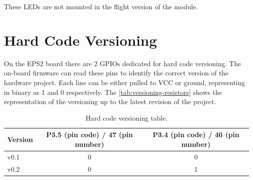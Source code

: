 These LEDs are not mounted in the flight version of the module.

\section{Hard Code Versioning}

On the EPS2 board there are 2 GPIOs dedicated for hard code versioning.
The on-board firmware can read these pins to identify the correct version of the hardware project.
Each line can be either pulled to VCC or ground, representing in binary as 1 and 0 respectively.
The \autoref{tab:versioning-resistors} shows the representation of the versioning up to the latest revision of the project.

\begin{table}[!h]
    \centering
    \begin{tabular}{lcc}
        \toprule[1.5pt]
        \textbf{Version}    &   \textbf{P3.5 (pin code) / 47 (pin number)}    &    \textbf{P3.4 (pin code) / 46 (pin number)}\\
        \midrule
        v0.1                & 0                 & 0              \\
        v0.2                & 0                 & 1              \\
        \bottomrule[1.5pt]
    \end{tabular}
    \caption{Hard code versioning table.}
    \label{tab:versioning-resistors}
\end{table}

